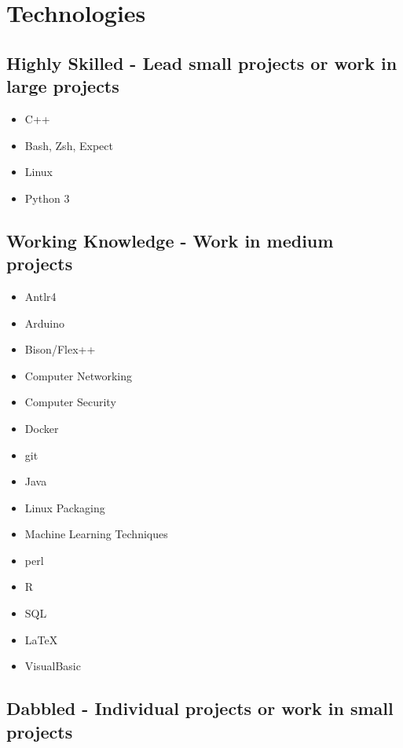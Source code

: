 \documentclass[10pt,a4paper,sans]{moderncv}        %
\begin{document}
\section{Technologies}

\subsection{Highly Skilled - Lead small projects or work in large projects}

\begin{multicols}{3}
\begin{itemize}

\item C++
\item Bash, Zsh, Expect
\item Linux
\item Python 3

\end{itemize}
\end{multicols}

\subsection{Working Knowledge - Work in medium projects}

\begin{multicols}{3}
\begin{itemize}

\item Antlr4 
\item Arduino
\item Bison/Flex++
\item Computer Networking
\item Computer Security
\item Docker
\item git
\item Java
\item Linux Packaging
\item Machine Learning Techniques
\item perl
\item R
\item SQL
\item { \selectfont  \LaTeX }
\item VisualBasic

\end{itemize}
\end{multicols}

\subsection{Dabbled - Individual projects or work in small projects}
\end{document}
